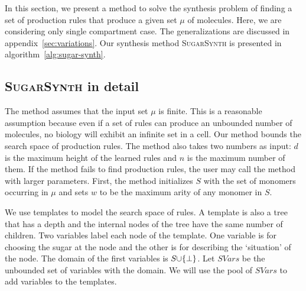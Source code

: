 In this section, we present a method to solve the synthesis problem of finding
a set of production rules that produce a given set $\mu$ of molecules.
Here, we are considering only single compartment case.
The generalizations are discussed in appendix~\ref{sec:variations}.
Our synthesis method \textsc{SugarSynth} is presented in algorithm~\ref{alg:sugar-synth}.




\subsection{\textsc{SugarSynth} in detail}

The method assumes that the input set $\mu$ is finite.
This is a reasonable assumption because
even if a set of rules can produce
an unbounded number of molecules,
no biology will exhibit an infinite set in a cell.
Our method
bounds the search space of production rules.
The method also takes two numbers as input:
$d$ is the maximum height of the learned rules
and 
$n$ is the maximum number of them.
If the method fails to find production rules,
the user may call the method with larger parameters.
First, the method initializes $S$ with the set of monomers occurring
in $\mu$
and sets $w$ to be the maximum arity of any monomer in $S$.


We use templates to model the search space of rules.
A template is also a tree that has a depth and
the internal nodes of the tree have the same number of children.
Two variables label each node of the template.
One variable is for choosing the sugar at the node and the other is for describing
the `situation' of the node.
The domain of the first variables is $S {\cup} \{\bot\}$.
Let $SVars$ be the unbounded set of variables with the domain.
We will use the pool of $SVars$ to add variables to the templates.

